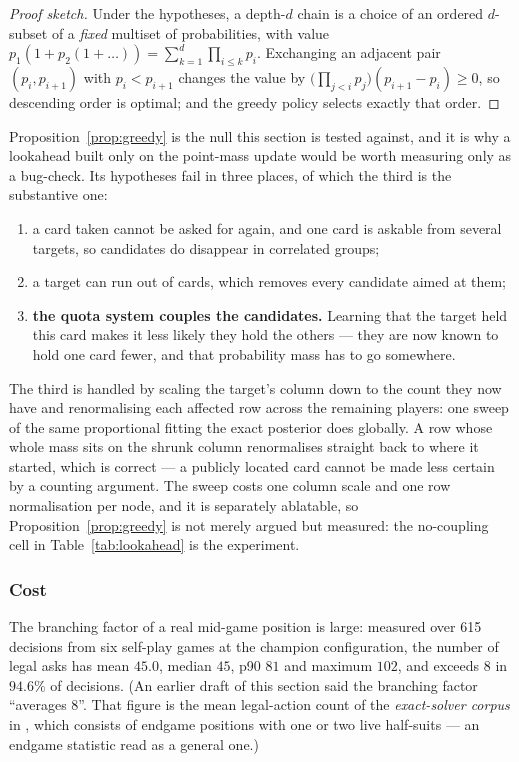 \documentclass[11pt,letterpaper]{article}
\begin{document}
\begin{proof}[Proof sketch]
Under the hypotheses, a depth-$d$ chain is a choice of an ordered $d$-subset of
a \emph{fixed} multiset of probabilities, with value
$p_{1}(1 + p_{2}(1 + \dots))= \sum_{k=1}^{d} \prod_{i \le k} p_{i}$. Exchanging
an adjacent pair $(p_i, p_{i+1})$ with $p_i < p_{i+1}$ changes the value by
$\bigl(\prod_{j<i} p_j\bigr)(p_{i+1} - p_i) \ge 0$, so descending order is
optimal; and the greedy policy selects exactly that order.
\end{proof}

Proposition~\ref{prop:greedy} is the null this section is tested against, and it
is why a lookahead built only on the point-mass update would be worth measuring
only as a bug-check. Its hypotheses fail in three places, of which the third is
the substantive one:

\begin{enumerate}
\item a card taken cannot be asked for again, and one card is askable from
several targets, so candidates do disappear in correlated groups;
\item a target can run out of cards, which removes every candidate aimed at
them;
\item \textbf{the quota system couples the candidates.} Learning that the target
held this card makes it less likely they hold the others --- they are now known
to hold one card fewer, and that probability mass has to go somewhere.
\end{enumerate}

The third is handled by scaling the target's column down to the count they now
have and renormalising each affected row across the remaining players: one sweep
of the same proportional fitting the exact posterior does globally. A row whose
whole mass sits on the shrunk column renormalises straight back to where it
started, which is correct --- a publicly located card cannot be made less
certain by a counting argument. The sweep costs one column scale and one row
normalisation per node, and it is separately ablatable, so
Proposition~\ref{prop:greedy} is not merely argued but measured: the
no-coupling cell in Table~\ref{tab:lookahead} is the experiment.

\subsubsection{Cost}
\label{sec:lookahead-cost}

The branching factor of a real mid-game position is large: measured over 615
decisions from six self-play games at the champion configuration, the number of
legal asks has mean $45.0$, median $45$, p90 $81$ and maximum $102$, and exceeds
$8$ in $94.6\%$ of decisions. (An earlier draft of this section said the
branching factor ``averages 8''. That figure is the mean legal-action count of
the \emph{exact-solver corpus} in
, which consists of endgame positions
with one or two live half-suits --- an endgame statistic read as a general one.)
\end{document}
